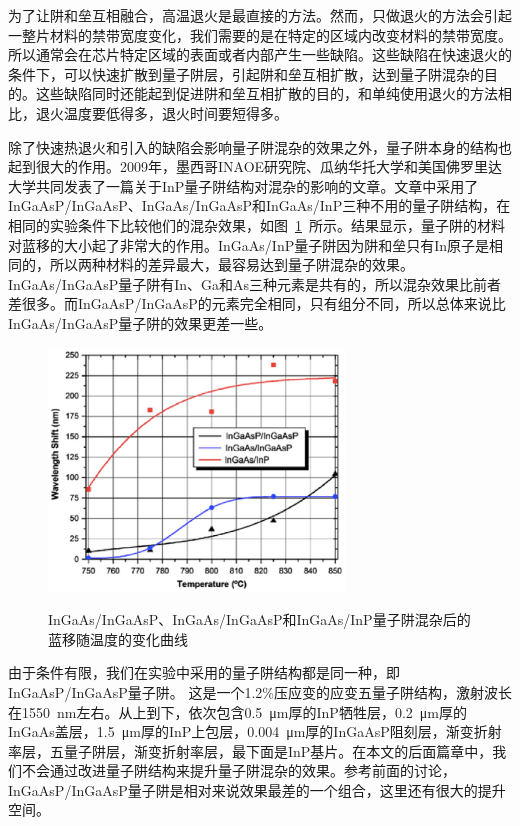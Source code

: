 \documentclass{ZJUthesis}
\begin{document}
为了让阱和垒互相融合，高温退火是最直接的方法。然而，只做退火的方法会引起一整片材料的禁带宽度变化，我们需要的是在特定的区域内改变材料的禁带宽度。所以通常会在芯片特定区域的表面或者内部产生一些缺陷。这些缺陷在快速退火的条件下，可以快速扩散到量子阱层，引起阱和垒互相扩散，达到量子阱混杂的目的。这些缺陷同时还能起到促进阱和垒互相扩散的目的，和单纯使用退火的方法相比，退火温度要低得多，退火时间要短得多。

除了快速热退火和引入的缺陷会影响量子阱混杂的效果之外，量子阱本身的结构也起到很大的作用。2009年，墨西哥INAOE研究院、瓜纳华托大学和美国佛罗里达大学共同发表了一篇关于InP量子阱结构对混杂的影响的文章\cite{May2009Intermixing}。文章中采用了InGaAsP/InGaAsP、InGaAs/InGaAsP和InGaAs/InP三种不用的量子阱结构，在相同的实验条件下比较他们的混杂效果，如图~\ref{fig_layers}~所示。结果显示，量子阱的材料对蓝移的大小起了非常大的作用。InGaAs/InP量子阱因为阱和垒只有In原子是相同的，所以两种材料的差异最大，最容易达到量子阱混杂的效果。InGaAs/InGaAsP量子阱有In、Ga和As三种元素是共有的，所以混杂效果比前者差很多。而InGaAsP/InGaAsP的元素完全相同，只有组分不同，所以总体来说比InGaAs/InGaAsP量子阱的效果更差一些。

\begin{figure}[htbp]
  \centering
  \includegraphics[width=0.7\textwidth]{./Pictures/layers.eps}\\
  \caption{InGaAs/InGaAsP、InGaAs/InGaAsP和InGaAs/InP量子阱混杂后的蓝移随温度的变化曲线}
  \label{fig_layers}
\end{figure}

由于条件有限，我们在实验中采用的量子阱结构都是同一种，即InGaAsP/InGaAsP量子阱。 这是一个1.2\%压应变的应变五量子阱结构，激射波长在1550~nm左右。从上到下，依次包含0.5~μm厚的InP牺牲层，0.2~μm厚的InGaAs盖层，1.5~μm厚的InP上包层，0.004~μm厚的InGaAsP阻刻层，渐变折射率层，五量子阱层，渐变折射率层，最下面是InP基片。在本文的后面篇章中，我们不会通过改进量子阱结构来提升量子阱混杂的效果。参考前面的讨论，InGaAsP/InGaAsP量子阱是相对来说效果最差的一个组合，这里还有很大的提升空间。
\end{document}
